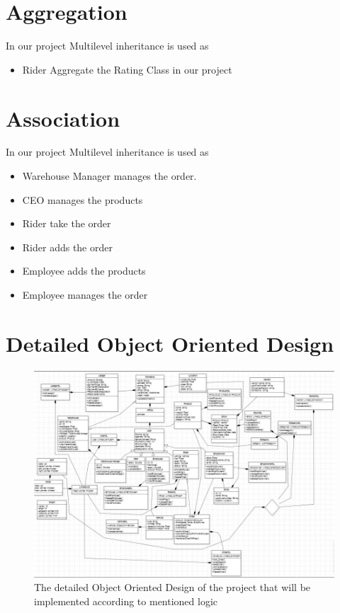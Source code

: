 \documentclass[12pt,a4paper]{article}
\begin{document}
\section*{Aggregation}
In our project Multilevel inheritance is used as
\begin{itemize}
\item Rider Aggregate the Rating Class in our project
\end{itemize}
\section*{Association}
In our project Multilevel inheritance is used as
\begin{itemize}
\item Warehouse Manager manages the order.
\item CEO manages the products
\item Rider take the order 
\item Rider adds the order
\item Employee adds the products
\item Employee manages the order 
\end{itemize}
\section{Detailed Object Oriented Design}
\begin{figure}
  \centering
    \includegraphics[scale=0.8]{Image.jpg}
  \caption{The detailed Object Oriented Design of the project that will be implemented according to mentioned logic}
\end{figure}
\end{document}

